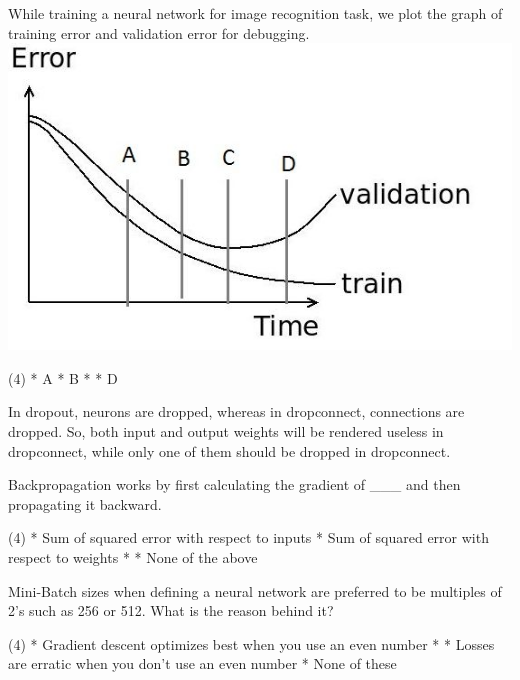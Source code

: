 \documentclass[10pt]{extarticle}
\begin{document}
\begin{exercise}
    While training a neural network for image recognition task, we plot the graph of training error and validation error for debugging.
    \includegraphics[width=.5\textwidth, height=.5\textwidth]{DL4}
    \begin{choice} (4)
        * A
        * B
        *
        * D
    \end{choice}
\end{exercise}
\begin{solution}
    In dropout, neurons are dropped, whereas in dropconnect, connections are dropped. So, both input and output weights will be rendered useless in dropconnect, while only one of them should be dropped in dropconnect.
\end{solution}

\begin{exercise}
    Backpropagation works by first calculating the gradient of \_\_\_ and then propagating it backward.
    \begin{choice} (4)
        * Sum of squared error with respect to inputs
        * Sum of squared error with respect to weights
        *
        * None of the above
    \end{choice}
\end{exercise}
\begin{solution}
\end{solution}

\begin{exercise}
    Mini-Batch sizes when defining a neural network are preferred to be multiples of 2's such as 256 or 512. What is the reason behind it?
    \begin{choice} (4)
        * Gradient descent optimizes best when you use an even number
        *
        * Losses are erratic when you don't use an even number
        * None of these
    \end{choice}
\end{exercise}
\begin{solution}
\end{solution}
\end{document}
